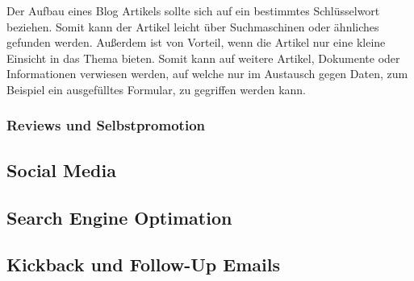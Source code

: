 \newline
Der Aufbau eines Blog Artikels sollte sich auf ein bestimmtes Schlüsselwort beziehen. Somit kann der Artikel leicht über Suchmaschinen oder ähnliches gefunden werden. Außerdem ist von Vorteil, wenn die Artikel nur eine kleine Einsicht in das Thema bieten. Somit kann auf weitere Artikel, Dokumente oder Informationen verwiesen werden, auf welche nur im Austausch gegen Daten, zum Beispiel ein ausgefülltes Formular, zu gegriffen werden kann. 

\subsubsection{Reviews und Selbstpromotion}

\subsection{Social Media}

\subsection{Search Engine Optimation}

\subsection{Kickback und Follow-Up Emails}



